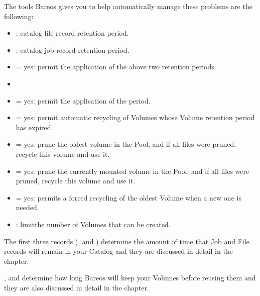 The tools Bareos gives you to help automatically manage these problems are the
following:

\begin{itemize}
\item {}: catalog file record retention period.
\item {}: catalog job record retention period.
\item {} = yes: permit the application of the above two retention periods.
\item {}
\item {} = yes: permit the application of the  period.
\item {} = yes: permit automatic recycling of Volumes whose Volume retention period has
   expired.
\item {} = yes: prune the oldest volume in the Pool, and if all
   files  were pruned, recycle this volume and use it.
\item {} = yes: prune the currently mounted volume in the
   Pool, and if all files  were pruned, recycle this volume and use it.
\item {} = yes: permits a forced recycling of the oldest Volume when a new one
   is  needed.\\
\item {}: limitthe number of Volumes that can be created.
\end{itemize}

The first three records
(,  and )
determine the amount of time that Job and File records will remain in your
Catalog and they are discussed in detail in the
 chapter.

,  and 
determine how long Bareos will keep
your Volumes before reusing them and they are also discussed in detail in the
 chapter.

